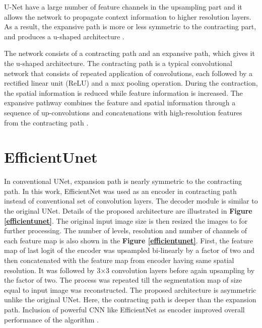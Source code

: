 \documentclass[conference]{IEEEtran}
\begin{document}
U-Net have a large number of feature channels in the upsampling part and it allows the network to propagate context information to higher resolution layers. As a result, the expansive path is more or less symmetric to the contracting part, and produces a u-shaped architecture \cite{long2015fully}. 

The network consists of a contracting path and an expansive path, which gives it the u-shaped architecture. The contracting path is a typical convolutional network that consists of repeated application of convolutions, each followed by a rectified linear unit (ReLU) and a max pooling operation. During the contraction, the spatial information is reduced while feature information is increased. The expansive pathway combines the feature and spatial information through a sequence of up-convolutions and concatenations with high-resolution features from the contracting path \cite{ronneberger2015u}.


\section{EfficientUnet}\label{effunet}
In conventional UNet, expansion path is nearly symmetric to the contracting path. In this work, EfficientNet was used as an encoder in contracting path instead
of conventional set of convolution layers. The decoder module is similar to the original UNet. Details of the proposed architecture are illustrated in \textbf{Figure \ref{efficientunet}}. The original input image size is  then resized the images to  for further processing. The number of levels, resolution and number of channels of each feature map is also shown in the \textbf{Figure \ref{efficientunet}}. First, the feature map of last logit of the encoder was upsampled bi-linearly by a factor of two and then concatenated with the feature map from encoder having same spatial resolution. It was followed by 3×3 convolution layers before again
upsampling by the factor of two. The process was repeated till the segmentation map of size equal to input image was reconstructed. The proposed architecture is asymmetric unlike the original UNet. Here, the contracting path is deeper than the expansion path. Inclusion of powerful CNN like EfficientNet as encoder improved overall performance of the algorithm \cite{baheti2020eff}.
\end{document}
